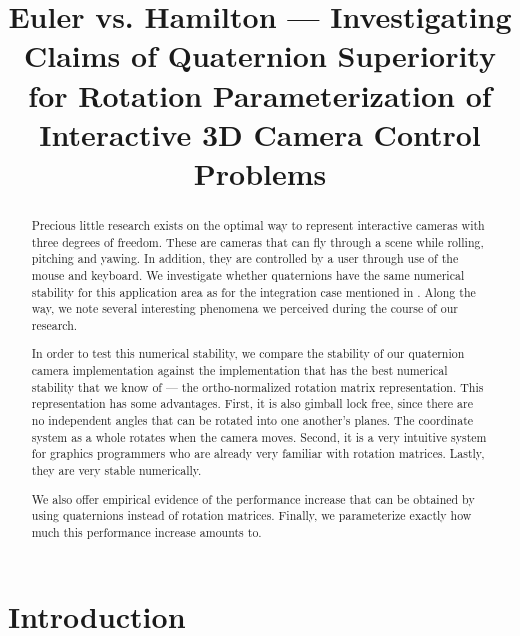 \documentclass{acm_proc_article-sp}
\title{Euler vs. Hamilton --- Investigating Claims of Quaternion Superiority for Rotation Parameterization of Interactive 3D Camera Control Problems}
\author{}
\date{}
\begin{document}
\maketitle

\begin{abstract}
Precious little research exists on the optimal way to represent interactive cameras with three degrees of freedom.
These are cameras that can fly through a scene while rolling, pitching and yawing.
In addition, they are controlled by a user through use of the mouse and keyboard.
We investigate whether quaternions have the same numerical stability for this application area as for the integration case mentioned in \cite{zupan11}.
Along the way, we note several interesting phenomena we perceived during the course of our research.

In order to test this numerical stability, we compare the stability of our quaternion camera implementation against the implementation that has the best numerical stability that we know of --- the ortho-normalized rotation matrix representation.
This representation has some advantages.
First, it is also gimball lock free, since there are no independent angles that can be rotated into one another's planes.
The coordinate system as a whole rotates when the camera moves.
Second, it is a very intuitive system for graphics programmers who are already very familiar with rotation matrices.
Lastly, they are very stable numerically.

We also offer empirical evidence of the performance increase that can be obtained by using quaternions instead of rotation matrices.
Finally, we parameterize exactly how much this performance increase amounts to.

\end{abstract}



\section{Introduction}
\end{document}
